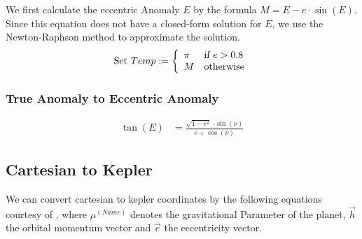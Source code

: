 \documentclass[11pt]{article}
\newcommand{\oa}[1]{\overrightarrow{#1}}
\begin{document}
We first calculate the eccentric Anomaly $E$ by the formula $M = E -
e\cdot \sin(E)$. Since this equation does not have a closed-form
solution for $E$, we use the Newton-Raphson method \cite{NeRaMe} to
approximate the solution.
\begin{align}
  \textrm{Set } Temp := \left\{
    \begin{array}{l l}
      \pi & \textrm{if } e > 0.8\\
      M & \textrm{otherwise}
    \end{array}
  \right.
\end{align}

\subsubsection{True Anomaly to Eccentric Anomaly}

\begin{align}
  \tan(E) & = \frac{\sqrt{1-e^2}\cdot \sin(\nu)}{e+\cos(\nu)}
\end{align}


\subsection{Cartesian to Kepler}

We can convert cartesian to kepler coordinates by the following
equations courtesy of \cite{RSCK}, where $\mu^{(Name)}$ denotes the
gravitational Parameter of the planet, $\oa{h}$ the orbital momentum
vector and $\oa{e}$ the eccentricity vector.
\end{document}
